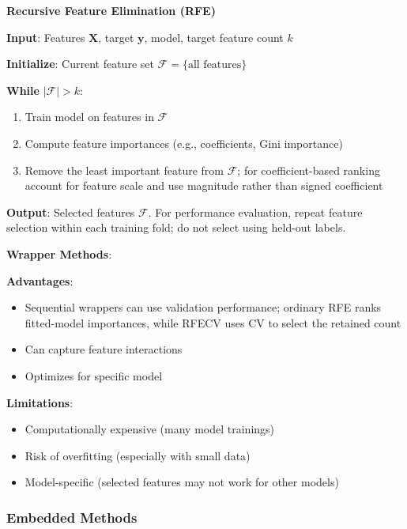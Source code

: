 \documentclass[11pt,twoside]{article}
\numberwithin{equation}{section}
\newcommand{\vect}[1]{\bm{#1}}
\theoremstyle{plain}
\theoremstyle{definition}
\theoremstyle{remark}
\newenvironment{keyidea}{
  \begin{tcolorbox}[colback=yellow!5!white,
                    colframe=yellow!50!black,
                    title=Key Idea,
                    breakable,
                    enhanced,
                    sharp corners,
                    boxrule=0.8pt,
                    left=6pt, right=6pt, top=6pt, bottom=6pt]
}{
  \end{tcolorbox}
}
\begin{document}
\begin{algorithmbox}
\textbf{Recursive Feature Elimination (RFE)}

\textbf{Input}: Features $\vect{X}$, target $\vect{y}$, model, target feature count $k$

\textbf{Initialize}: Current feature set $\mathcal{F} = \{\text{all features}\}$

\textbf{While} $|\mathcal{F}| > k$:
\begin{enumerate}
\item Train model on features in $\mathcal{F}$
\item Compute feature importances (e.g., coefficients, Gini importance)
\item Remove the least important feature from $\mathcal{F}$; for coefficient-based ranking account for feature scale and use magnitude rather than signed coefficient
\end{enumerate}

\textbf{Output}: Selected features $\mathcal{F}$. For performance evaluation, repeat feature selection within each training fold; do not select using held-out labels.
\end{algorithmbox}

\begin{keyidea}
\textbf{Wrapper Methods}:

\textbf{Advantages}:
\begin{itemize}
\item Sequential wrappers can use validation performance; ordinary RFE ranks fitted-model importances, while RFECV uses CV to select the retained count
\item Can capture feature interactions
\item Optimizes for specific model
\end{itemize}

\textbf{Limitations}:
\begin{itemize}
\item Computationally expensive (many model trainings)
\item Risk of overfitting (especially with small data)
\item Model-specific (selected features may not work for other models)
\end{itemize}
\end{keyidea}

\subsubsection{Embedded Methods}
\end{document}
